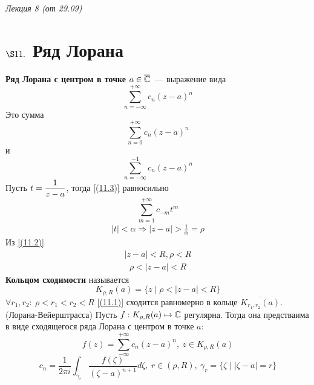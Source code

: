 \begin{flushright}
    \textit{Лекция 8 (от 29.09)}
\end{flushright}
\section{$\S 11.$ Ряд Лорана}
\Def \textbf{Ряд Лорана с центром в точке $a \in \overline{\mathbb{C}}$}~--- выражение вида
\begin{equation}\label{(11.1)}
    \sum_{n=-\infty}^{+\infty}c_n(z-a)^n
\end{equation}
Это сумма
\begin{equation}\label{(11.2)}
    \sum_{n=0}^{+\infty}c_n(z-a)^n
\end{equation}
и
\begin{equation}\label{(11.3)}
    \sum_{n=-\infty}^{-1}c_n(z-a)^n
\end{equation}
Пусть $t = \displaystyle \frac{1}{z-a}$, тогда \eqref{(11.3)} равносильно
\begin{equation}\label{(11.4)}
    \sum_{m=1}^{+\infty}c_{-m}t^m
\end{equation}
\begin{align*}
  \left| t \right| < \alpha \Rightarrow \left| z - a \right| > \frac{1}{\alpha} = \rho
\end{align*}
Из \eqref{(11.2)}
\begin{align*}
  \left| z-a \right|<R, \rho < R
\end{align*}
\begin{align*}
  \rho < \left| z-a \right| < R
\end{align*}
\textbf{Кольцом сходимости} называется
\begin{equation}\label{(11.5)}
    K_{\rho, R}(a) = \{z \mid \rho < \left| z-a \right| < R\}
\end{equation}
$\forall r_1, r_2: \ \rho < r_1 < r_2 < R$ \eqref{(11.1)} сходится
равномерно в кольце $\overline{K_{r_1,r_2}(a)}$.
\theorem (Лорана-Вейерштрасса)
Пусть $f: K_{\rho,R}(a) \mapsto \mathbb{C}$ регулярна. Тогда она предстваима в виде
сходящегося ряда Лорана с центром в точке $a$:
\begin{equation}\label{(11.6)}
    f(z) = \sum_{-\infty}^{+\infty}c_n(z-a)^n, \ z \in K_{\rho,R}(a)
\end{equation}
\begin{equation}\label{(11.7)}
    c_n = \frac{1}{2\pi i}\int_{\gamma_r}\frac{f(\zeta)}{(\zeta - a)^{n+1}}d\zeta, \ r \in (\rho, R), \ \gamma_r = \{\zeta \mid \left| \zeta - a \right| = r\}
\end{equation}
